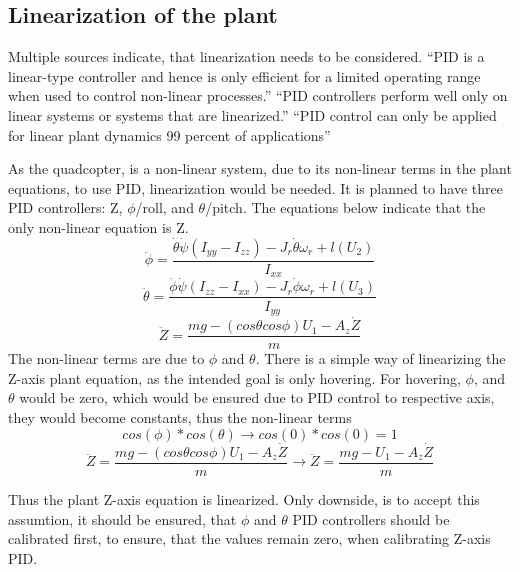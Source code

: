 \subsection{Linearization of the plant}

Multiple sources indicate, that linearization needs to be considered. “PID is a linear-type controller and hence is only efficient for a limited operating range when used to control non-linear processes.” \cite{PIDLinear1} “PID controllers perform well only on linear systems or systems that are linearized.” \cite{PIDLinear2} “PID control can only be applied for linear plant dynamics 99 percent of applications” \cite{PIDLinear3} 

As the quadcopter, is a non-linear system, due to its non-linear terms in the plant equations, to use PID, linearization would be needed. It is planned to have three PID controllers: Z, $\phi$/roll, and $\theta$/pitch. The equations below indicate that the only non-linear equation is Z.
\begin{displaymath}
    \ddot{\phi} = \frac{\dot{\theta}\dot{\psi}(I_{yy}-I_{zz})-J_r\dot{\theta}\omega_r+l(U_2)}{I_{xx}}
\end{displaymath}
\begin{displaymath}
    \ddot{\theta} = \frac{\dot{\phi}\dot{\psi}(I_{zz}-I_{xx})-J_r\dot{\phi}\omega_r+l(U_3)}{I_{yy}}
\end{displaymath}
\begin{displaymath}
    \ddot{Z} = \frac{mg - (cos\theta cos \phi )U_1 - A_z\dot{Z} }{m}
\end{displaymath}
The non-linear terms are due to $\phi$ and $\theta$. There is a simple way of linearizing the Z-axis plant equation, as the intended goal is only hovering. 
For hovering, $\phi$, and $\theta$ would be zero, which would be ensured due to PID control to respective axis, they would become constants, thus the non-linear terms 
\begin{displaymath}
    cos(\phi)*cos(\theta) \longrightarrow cos(0)*cos(0) = 1
\end{displaymath}
\begin{displaymath}
    \ddot{Z} = \frac{mg - (cos\theta cos \phi )U_1 - A_z\dot{Z} }{m} \longrightarrow \ddot{Z} = \frac{mg - U_1 - A_z\dot{Z} }{m}
\end{displaymath}

Thus the plant Z-axis equation is linearized. Only downside, is to accept this assumtion, it should be ensured, that $\phi$ and $\theta$ PID controllers should be calibrated first, to ensure, that the values remain zero, when calibrating Z-axis PID.


